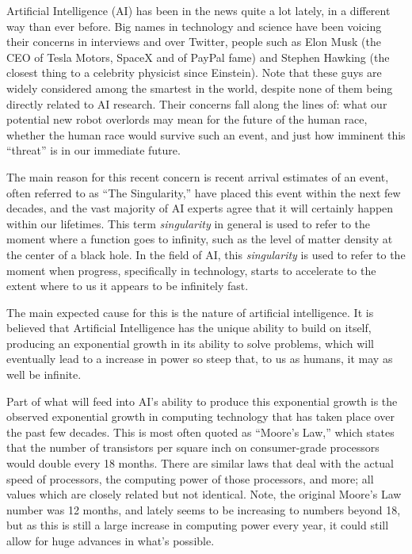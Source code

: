 \documentclass[12pt]{article} %
\begin{document}
Artificial Intelligence (AI) has been in the news quite a lot lately, in a different way than ever before. Big names in technology and science have been voicing their concerns in interviews and over Twitter, people such as Elon Musk (the CEO of Tesla Motors, SpaceX and of PayPal fame) and Stephen Hawking (the closest thing to a celebrity physicist since Einstein). Note that these guys are widely considered among the smartest in the world, despite none of them being directly related to AI research. Their concerns fall along the lines of: what our potential new robot overlords may mean for the future of the human race, whether the human race would survive such an event, and just how imminent this ``threat'' is in our immediate future.

The main reason for this recent concern is recent arrival estimates of an event, often referred to as ``The Singularity,'' have placed this event within the next few decades, and the vast majority of AI experts agree that it will certainly happen within our lifetimes. This term \textit{singularity} in general is used to refer to the moment where a function goes to infinity, such as the level of matter density at the center of a black hole. In the field of AI, this \textit{singularity} is used to refer to the moment when progress, specifically in technology, starts to accelerate to the extent where to us it appears to be infinitely fast.

The main expected cause for this is the nature of artificial intelligence. It is believed that Artificial Intelligence has the unique ability to build on itself, producing an exponential growth in its ability to solve problems, which will eventually lead to a increase in power so steep that, to us as humans, it may as well be infinite.

Part of what will feed into AI's ability to produce this exponential growth is the observed exponential growth in computing technology that has taken place over the past few decades. This is most often quoted as ``Moore's Law,'' which states that the number of transistors per square inch on consumer-grade processors would double every 18 months. There are similar laws that deal with the actual speed of processors, the computing power of those processors, and more; all values which are closely related but not identical. Note, the original Moore's Law number was 12 months, and lately seems to be increasing to numbers beyond 18, but as this is still a large increase in computing power every year, it could still allow for huge advances in what's possible.
\end{document}
